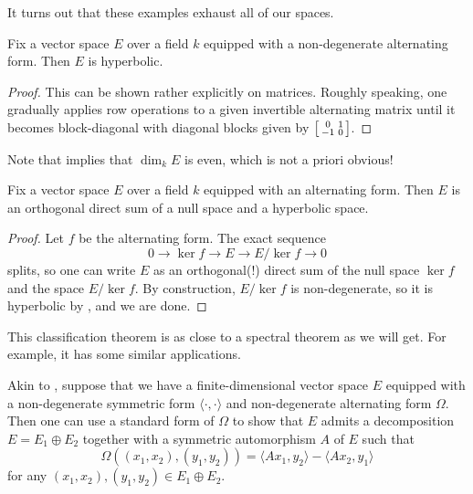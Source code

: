 \documentclass[../notes.tex]{subfiles}
\begin{document}
It turns out that these examples exhaust all of our spaces.
\begin{proposition} \label{prop:classify-non-degen-alt-forms}
	Fix a vector space $E$ over a field $k$ equipped with a non-degenerate alternating form. Then $E$ is hyperbolic.
\end{proposition}
\begin{proof}
	This can be shown rather explicitly on matrices. Roughly speaking, one gradually applies row operations to a given invertible alternating matrix until it becomes block-diagonal with diagonal blocks given by $\begin{bsmallmatrix}
		0 & 1 \\ -1 & 0
	\end{bsmallmatrix}$.
\end{proof}
\begin{remark}
	Note that  implies that $\dim_k E$ is even, which is not a priori obvious!
\end{remark}
\begin{corollary}
	Fix a vector space $E$ over a field $k$ equipped with an alternating form. Then $E$ is an orthogonal direct sum of a null space and a hyperbolic space.
\end{corollary}
\begin{proof}
	Let $f$ be the alternating form. The exact sequence
	\[0\to\ker f\to E\to E/\ker f\to 0\]
	splits, so one can write $E$ as an orthogonal(!) direct sum of the null space $\ker f$ and the space $E/\ker f$. By construction, $E/\ker f$ is non-degenerate, so it is hyperbolic by , and we are done.
\end{proof}
This classification theorem is as close to a spectral theorem as we will get. For example, it has some similar applications.
\begin{remark}
	Akin to , suppose that we have a finite-dimensional vector space $E$ equip\-ped with a non-degenerate symmetric form $\langle\cdot,\cdot\rangle$ and non-degenerate alternating form $\Omega$. Then one can use a standard form of $\Omega$ to show that $E$ admits a decomposition $E=E_1\oplus E_2$ together with a symmetric automorphism $A$ of $E$ such that
	\[\Omega((x_1,x_2),(y_1,y_2))=\langle Ax_1,y_2\rangle-\langle Ax_2,y_1\rangle\]
	for any $(x_1,x_2),(y_1,y_2)\in E_1\oplus E_2$.
\end{remark}
\end{document}
